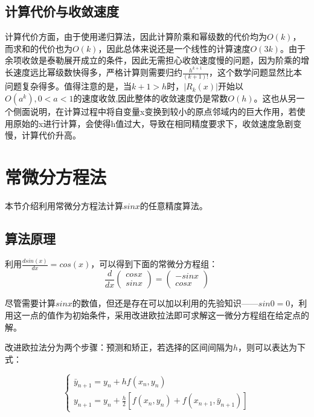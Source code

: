\documentclass[UTF8]{ctexart}
\begin{document}
\subsection{计算代价与收敛速度}
计算代价方面，由于使用递归算法，因此计算阶乘和幂级数的代价均为$O(k)$，而求和的代价也为$O(k)$，因此总体来说还是一个线性的计算速度$O(3k)$。由于余项收敛是泰勒展开成立的条件，因此无需担心收敛速度慢的问题，因为阶乘的增长速度远比幂级数快得多，严格计算则需要归约$\frac{h^{k+1}}{(k+1)!}$，这个数学问题显然比本问题复杂得多。值得注意的是，当$k+1>h$时，$|R_k(x)|$开始以$O(a^{k}),0<a<1$的速度收敛,因此整体的收敛速度仍是常数$O(h)$。这也从另一个侧面说明，在计算过程中将自变量x变换到较小的原点邻域内的巨大作用，若使用原始的x进行计算，会使得h值过大，导致在相同精度要求下，收敛速度急剧变慢，计算代价升高。
\section{常微分方程法}

本节介绍利用常微分方程法计算$sinx$的任意精度算法。

\subsection{算法原理}
利用$\frac{dsin(x)}{dx}=cos(x)$，可以得到下面的常微分方程组：
\begin{equation}
    \frac{d}{dx}\left(
    \begin{matrix}
            cosx \\
            sinx
        \end{matrix}
    \right)=\left(
    \begin{matrix}
            -sinx \\
            cosx
        \end{matrix}
    \right)
\end{equation}

尽管需要计算$sinx$的数值，但还是存在可以加以利用的先验知识——$sin0 = 0$，利用这一点的值作为初始条件，采用改进欧拉法即可求解这一微分方程组在给定点的解。

改进欧拉法分为两个步骤：预测和矫正，若选择的区间间隔为$h$，则可以表达为下式：

\begin{equation}
    \begin{cases}
        \bar{y}_{n+1}=y_n+hf(x_n,y_n) \\
        y_{n+1}=y_n+\frac{h}{2}[f(x_n,y_n)+f(x_{n+1},\bar{y}_{n+1})]
    \end{cases}
\end{equation}
\end{document}
